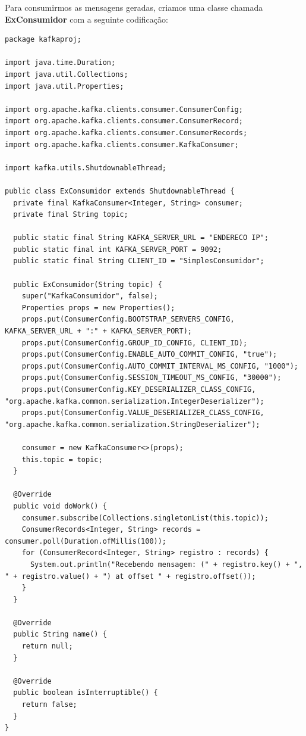 \documentclass[a4paper,11pt]{article}
\begin{document}
Para consumirmos as mensagens geradas, criamos uma classe chamada \textbf{ExConsumidor} com a seguinte codificação:
\begin{lstlisting}[]
package kafkaproj;

import java.time.Duration;
import java.util.Collections;
import java.util.Properties;

import org.apache.kafka.clients.consumer.ConsumerConfig;
import org.apache.kafka.clients.consumer.ConsumerRecord;
import org.apache.kafka.clients.consumer.ConsumerRecords;
import org.apache.kafka.clients.consumer.KafkaConsumer;

import kafka.utils.ShutdownableThread;

public class ExConsumidor extends ShutdownableThread {
  private final KafkaConsumer<Integer, String> consumer;
  private final String topic;
     
  public static final String KAFKA_SERVER_URL = "ENDERECO IP";
  public static final int KAFKA_SERVER_PORT = 9092;
  public static final String CLIENT_ID = "SimplesConsumidor";
 
  public ExConsumidor(String topic) {
    super("KafkaConsumidor", false);
    Properties props = new Properties();
    props.put(ConsumerConfig.BOOTSTRAP_SERVERS_CONFIG, KAFKA_SERVER_URL + ":" + KAFKA_SERVER_PORT);
    props.put(ConsumerConfig.GROUP_ID_CONFIG, CLIENT_ID);
    props.put(ConsumerConfig.ENABLE_AUTO_COMMIT_CONFIG, "true");
    props.put(ConsumerConfig.AUTO_COMMIT_INTERVAL_MS_CONFIG, "1000");
    props.put(ConsumerConfig.SESSION_TIMEOUT_MS_CONFIG, "30000");
    props.put(ConsumerConfig.KEY_DESERIALIZER_CLASS_CONFIG, "org.apache.kafka.common.serialization.IntegerDeserializer");
    props.put(ConsumerConfig.VALUE_DESERIALIZER_CLASS_CONFIG, "org.apache.kafka.common.serialization.StringDeserializer");
 
    consumer = new KafkaConsumer<>(props);
    this.topic = topic;
  }
 
  @Override
  public void doWork() {
    consumer.subscribe(Collections.singletonList(this.topic));
    ConsumerRecords<Integer, String> records = consumer.poll(Duration.ofMillis(100));
    for (ConsumerRecord<Integer, String> registro : records) {
      System.out.println("Recebendo mensagem: (" + registro.key() + ", " + registro.value() + ") at offset " + registro.offset());
    }
  }
 
  @Override
  public String name() {
    return null;
  }
 
  @Override
  public boolean isInterruptible() {
    return false;
  }
}
\end{lstlisting}
\end{document}
